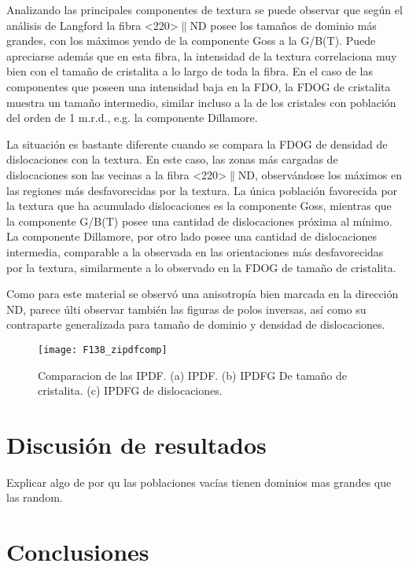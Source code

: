 Analizando las principales componentes de textura se puede observar que según el análisis de Langford la fibra \textless220\textgreater$\parallel$ND posee los tamaños de dominio más grandes, con los máximos yendo de la componente Goss a la G/B(T).
Puede apreciarse además que en esta fibra, la intensidad de la textura correlaciona muy bien con el tamaño de cristalita a lo largo de toda la fibra.
En el caso de las componentes que poseen una intensidad baja en la FDO, la FDOG de cristalita muestra un tamaño intermedio, similar incluso a la de los cristales con población del orden de 1 m.r.d., e.g. la componente Dillamore.

La situación es bastante diferente cuando se compara la FDOG de densidad de dislocaciones con la textura.
En este caso, las zonas más cargadas de dislocaciones son las vecinas a la fibra \textless220\textgreater$\parallel$ND, observándose los máximos en las regiones más desfavorecidas por la textura.
La única población favorecida por la textura que ha acumulado dislocaciones es la componente Goss, mientras que la componente G/B(T) posee una cantidad de dislocaciones próxima al mínimo. 
La componente Dillamore, por otro lado posee una cantidad de dislocaciones intermedia, comparable a la observada en las orientaciones más desfavorecidas por la textura, similarmente a lo observado en la FDOG de tamaño de cristalita.

Como para este material se observó una anisotropía bien marcada en la dirección ND, parece últi observar también las figuras de polos inversas, así como su contraparte generalizada para tamaño de dominio y densidad de dislocaciones.

\begin{figure}[!htb]
  \centering
  \texttt{[image: F138\_zipdfcomp]}
  \caption{Comparacion de las IPDF. (a) IPDF. (b) IPDFG De tamaño de cristalita. (c) IPDFG de dislocaciones.}
  \label{fig:F138IPDFComp}
\end{figure}

\newpage
\section{Discusión de resultados}\label{S:F138Dis}
Explicar algo de por qu las poblaciones vacías tienen dominios mas grandes que las random.

\newpage
\section{Conclusiones}\label{S:F138Conclusiones}

